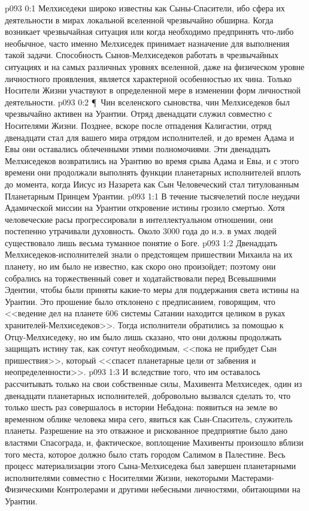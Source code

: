 \vs p093 0:1 Мелхиседеки широко известны как Сыны\hyp{}Спасители, ибо сфера их деятельности в мирах локальной вселенной чрезвычайно обширна. Когда возникает чрезвычайная ситуация или когда необходимо предпринять что\hyp{}либо необычное, часто именно Мелхиседек принимает назначение для выполнения такой задачи. Способность Сынов\hyp{}Мелхиседеков работать в чрезвычайных ситуациях и на самых различных уровнях вселенной, даже на физическом уровне личностного проявления, является характерной особенностью их чина. Только Носители Жизни участвуют в определенной мере в изменении форм личностной деятельности.
\vs p093 0:2 \P\ Чин вселенского сыновства, чин Мелхиседеков был чрезвычайно активен на Урантии. Отряд двенадцати служил совместно с Носителями Жизни. Позднее, вскоре после отпадения Калигастии, отряд двенадцати стал для вашего мира отрядом исполнителей, и до времен Адама и Евы они оставались облеченными этими полномочиями. Эти двенадцать Мелхиседеков возвратились на Урантию во время срыва Адама и Евы, и с этого времени они продолжали выполнять функции планетарных исполнителей вплоть до момента, когда Иисус из Назарета как Сын Человеческий стал титулованным Планетарным Принцем Урантии.
\vs p093 1:1 В течение тысячелетий после неудачи Адамической миссии на Урантии откровение истины грозило смертью. Хотя человеческие расы прогрессировали в интеллектуальном отношении, они постепенно утрачивали духовность. Около 3000 года до н.э. в умах людей существовало лишь весьма туманное понятие о Боге.
\vs p093 1:2 Двенадцать Мелхиседеков\hyp{}исполнителей знали о предстоящем пришествии Михаила на их планету, но им было не известно, как скоро оно произойдет; поэтому они собрались на торжественный совет и ходатайствовали перед Всевышними Эдентии, чтобы были приняты какие\hyp{}то меры для поддержания света истины на Урантии. Это прошение было отклонено с предписанием, говорящим, что <<ведение дел на планете 606 системы Сатании находится целиком в руках хранителей\hyp{}Мелхиседеков>>. Тогда исполнители обратились за помощью к Отцу\hyp{}Мелхиседеку, но им было лишь сказано, что они должны продолжать защищать истину так, как сочтут необходимым, <<пока не прибудет Сын пришествия>>, который <<спасет планетарные цели от забвения и неопределенности>>.
\vs p093 1:3 И вследствие того, что им оставалось рассчитывать только на свои собственные силы, Махивента Мелхиседек, один из двенадцати планетарных исполнителей, добровольно вызвался сделать то, что только шесть раз совершалось в истории Небадона: появиться на земле во временном облике человека мира сего, явиться как Сын\hyp{}Спаситель, служитель планеты. Разрешение на это отважное и рискованное предприятие было дано властями Спасограда, и, фактическое, воплощение Махивенты произошло вблизи того места, которое должно было стать городом Салимом в Палестине. Весь процесс материализации этого Сына\hyp{}Мелхиседека был завершен планетарными исполнителями совместно с Носителями Жизни, некоторыми Мастерами\hyp{}Физическими Контролерами и другими небесными личностями, обитающими на Урантии.
